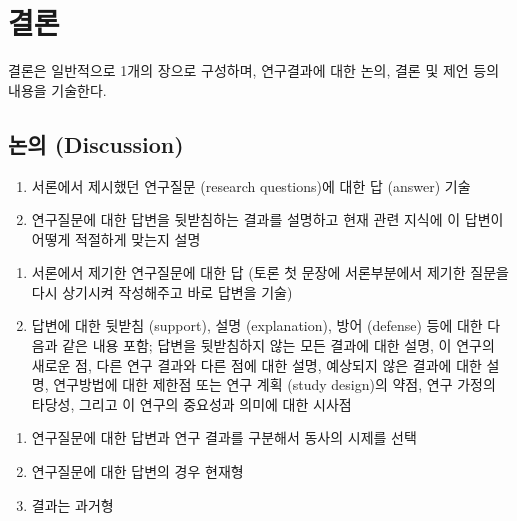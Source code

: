 \chapter{결\quad 론}


결론은 일반적으로 1개의 장으로 구성하며, 연구결과에 대한 논의, 결론 및 제언 등의 내용을 기술한다.

\section{논의 (Discussion)}

\begin{enumerate}
    \item 서론에서 제시했던 연구질문 (research questions)에 대한 답 (answer) 기술
    \item 연구질문에 대한 답변을 뒷받침하는 결과를 설명하고 현재 관련 지식에 이 답변이 어떻게 적절하게 맞는지 설명
\end{enumerate}

\begin{enumerate}
    \item 서론에서 제기한 연구질문에 대한 답 (토론 첫 문장에 서론부분에서 제기한 질문을 다시 상기시켜 작성해주고 바로 답변을 기술)
    
    \item 답변에 대한 뒷받침 (support), 설명 (explanation), 방어 (defense) 등에 대한 다음과 같은 내용 포함; 답변을 뒷받침하지 않는 모든 결과에 대한 설명, 이 연구의 새로운 점, 다른 연구 결과와 다른 점에 대한 설명, 예상되지 않은 결과에 대한 설명, 연구방법에 대한 제한점 또는 연구 계획 (study design)의 약점, 연구 가정의 타당성, 그리고 이 연구의 중요성과 의미에 대한 시사점
\end{enumerate}

\begin{enumerate}
    \item 연구질문에 대한 답변과 연구 결과를 구분해서 동사의 시제를 선택
    \item 연구질문에 대한 답변의 경우 현재형
    \item 결과는 과거형
\end{enumerate}